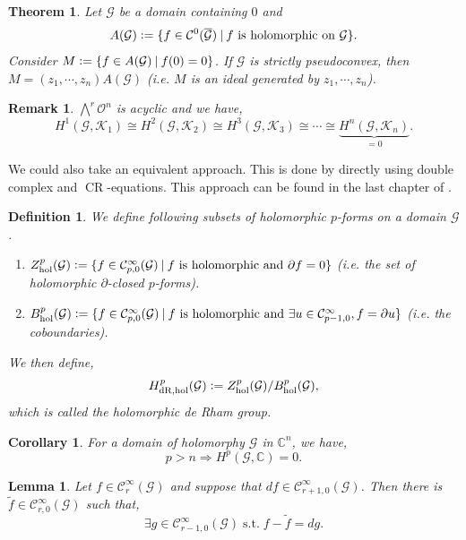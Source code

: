 \documentclass{article}
\newtheorem{theorem}{Theorem} [section]
\newtheorem{definition}{Definition}[section]
\newtheorem{lemma}{Lemma}[section]
\newtheorem{remark}{Remark}[section]
\newtheorem{corollary}{Corollary} [section]
\DeclareMathOperator{\CR}{CR}
\DeclareMathOperator{\hol}{hol}
\DeclareMathOperator{\st}{s.t.}
\DeclareMathOperator{\dR}{dR}
\newcommand{\defeq}{\vcentcolon=}
\newcommand{\C}[0]{\mathbb{C}}
\newcommand{\G}[0]{\mathcal{G}}
\newcommand{\sep}[0]{\:|\:}
\newcommand{\Ouv}[0]{\mathcal{O}}
\newcommand{\ck}[1]{\mathcal{C}^{#1}}
\newcommand{\cinf}[0]{\ck{\infty}}
\begin{document}
\begin{theorem}
  Let $\G$ be a domain containing $0$ and 
  \begin{equation*}
    A(\G)\defeq\{f\in\mathcal{C}^0(\overline{\G})\sep \text{$f$ is holomorphic on $\G$}\}.
  \end{equation*} 
  Consider $M \defeq\{f\in A(\G)\sep f(0)=0\}$. If $\G$ is strictly pseudoconvex, then $M = (z_1,\cdots,z_n)A(\G)$ (i.e. $M$ is an ideal generated by $z_1,\cdots,z_n$).
\end{theorem}

\begin{remark}
  $\bigwedge^r \Ouv^n$ is acyclic and we have,
  \begin{equation*}
    H^1(\G,\mathcal{K}_1)\cong H^2(\G,\mathcal{K}_2)\cong H^3(\G,\mathcal{K}_3)\cong \cdots\cong \underbrace{H^n(\G,\mathcal{K}_n)}_{=0}.
  \end{equation*}
\end{remark}
We could also take an equivalent approach. This is done by directly using double complex and $\CR$-equations. This approach can be found in the last chapter of \cite{LiM}.
\begin{definition}
  We define following subsets of holomorphic $p$-forms on a domain $\G$.
  \begin{enumerate}[1).]
    \item $Z^p_{\hol}(\G)\defeq\{f\in\cinf_{p,0}(\G)\sep \text{$f$ is holomorphic and }\partial f=0\}$ (i.e. the set of holomorphic $\partial$-closed $p$-forms). 
    \item $B_{\hol}^p(\G)\defeq\{f\in\cinf_{p,0}(\G)\sep \text{$f$ is holomorphic and }\exists u\in \cinf_{p-1,0},f=\partial u\}$ (i.e. the coboundaries).
  \end{enumerate}
  We then define,
  \begin{equation*}
    H_{\dR,\hol}^p(\G) \defeq Z_{\hol}^p(\G)/B_{\hol}^p(\G),
  \end{equation*}
  which is called the holomorphic de Rham group.
  \end{definition}
  \begin{corollary}
    For a domain of holomorphy $\G$ in $\C^n$, we have,
    \begin{equation*}
      p>n\Rightarrow H^p(\G,\C)=0.
    \end{equation*}
  \end{corollary}
  \begin{lemma}
    Let $f\in\cinf_{r}(\G)$ and suppose that $df\in\cinf_{r+1,0}(\G)$. Then there is $\tilde{f}\in\cinf_{r,0}(\G)$ such that,
    \begin{equation*}
      \exists g\in\cinf_{r-1,0}(\G)\st f-\tilde{f}=dg.
    \end{equation*}
    \label{lemma_cohomology_decomposition_pseudoconvex}
  \end{lemma}
\end{document}
